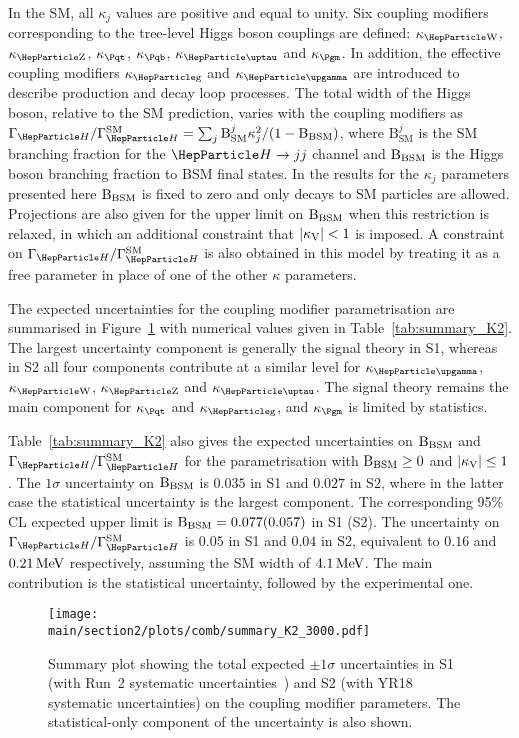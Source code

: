 In the SM, all $\kappa_j$ values are positive and equal to unity. Six coupling modifiers corresponding to the tree-level Higgs boson couplings are defined: $\kW$, $\kZ$, $\ktop$, $\kb$, $\ktau$ and $\kmu$. In addition, the effective coupling modifiers $\kglu$ and $\kgam$ are introduced to describe \ggh production and \hgg decay loop processes. The total width of the Higgs boson, relative to the SM prediction, varies with the coupling modifiers as $\GammaSM = \sum_{j}\mathrm{B}^{j}_{\text{SM}}\kappa_{j}^{2} / (1 - \Bbsm)$, where $\mathrm{B}^{j}_{\text{SM}}$ is the SM branching fraction for the $\PH\rightarrow jj$ channel and $\mathrm{B_{BSM}}$ is the Higgs boson branching fraction to BSM final states. In the results for the $\kappa_j$ parameters presented here $\mathrm{B_{BSM}}$ is fixed to zero and only decays to SM particles are allowed. Projections are also given for the upper limit on $\mathrm{B_{BSM}}$ when this restriction is relaxed, in which an additional constraint that $|\kappa_{\mathrm{V}}| < 1$ is imposed. A constraint on $\GammaSM$ is also obtained in this model by treating it as a free parameter in place of one of the other $\kappa$ parameters.

The expected uncertainties for the coupling modifier parametrisation are summarised in Figure~\ref{fig:summary_K2} with numerical values given in Table~\ref{tab:summary_K2}. The largest uncertainty component is generally the signal theory in S1, whereas in S2 all four components contribute at a similar level for $\kgam$, $\kW$, $\kZ$ and $\ktau$. The signal theory remains the main component for $\ktop$ and $\kglu$, and $\kmu$ is limited by statistics.

Table~\ref{tab:summary_K2} also gives the expected uncertainties on $\mathrm{B_{BSM}}$ and $\GammaSM$ for the parametrisation with $\mathrm{B_{BSM}}\geq0$ and $|\kappa_{\mathrm{V}}|\leq1$. The $1\sigma$ uncertainty on $\mathrm{B_{BSM}}$ is $0.035$ in S1 and $0.027$ in S2, where in the latter case the statistical uncertainty is the largest component. The corresponding 95\% CL expected upper limit is $\mathrm{B_{BSM}} = 0.077 (0.057)$ in S1 (S2). The uncertainty on $\GammaSM$ is $0.05$ in S1 and $0.04$ in S2, equivalent to $0.16$ and $0.21\,\text{Me\hspace{-.08em}V}$ respectively, assuming the SM width of $4.1\,\text{Me\hspace{-.08em}V}$. The main contribution is the statistical uncertainty, followed by the experimental one.

\begin{figure}[hbtp]
\centering
\texttt{[image: \\main/section2/plots/comb/summary\_K2\_3000.pdf]}%
\caption{Summary plot showing the total expected $\pm 1\sigma$ uncertainties in S1 (with Run~2 systematic uncertainties~\cite{Sirunyan:2018koj}) and S2 (with YR18 systematic uncertainties) on the coupling modifier parameters. The statistical-only component of the uncertainty is also shown.}
\label{fig:summary_K2}
\end{figure}


